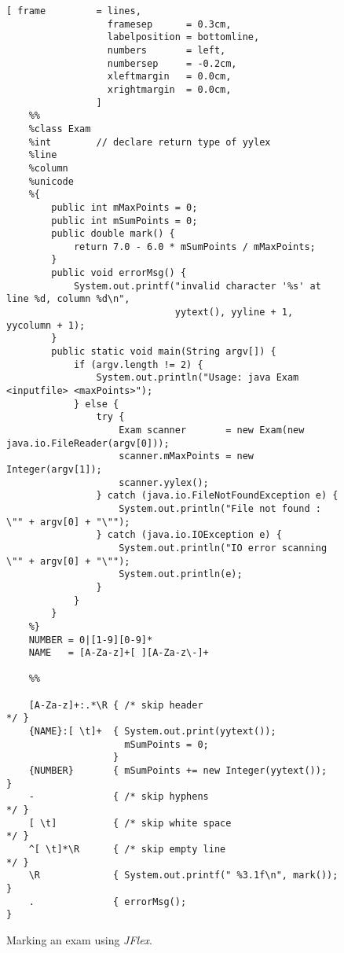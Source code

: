 \begin{figure}[!ht]
\centering
\begin{Verbatim}[ frame         = lines, 
                  framesep      = 0.3cm, 
                  labelposition = bottomline,
                  numbers       = left,
                  numbersep     = -0.2cm,
                  xleftmargin   = 0.0cm,
                  xrightmargin  = 0.0cm,
                ]
    %%
    %class Exam
    %int        // declare return type of yylex
    %line
    %column
    %unicode
    %{
        public int mMaxPoints = 0;
        public int mSumPoints = 0;
        public double mark() {
            return 7.0 - 6.0 * mSumPoints / mMaxPoints;
        } 
        public void errorMsg() {
            System.out.printf("invalid character '%s' at line %d, column %d\n", 
                              yytext(), yyline + 1, yycolumn + 1); 
        }    
        public static void main(String argv[]) {
            if (argv.length != 2) {
                System.out.println("Usage: java Exam <inputfile> <maxPoints>");
            } else {
                try {
                    Exam scanner       = new Exam(new java.io.FileReader(argv[0]));
                    scanner.mMaxPoints = new Integer(argv[1]);
                    scanner.yylex();
                } catch (java.io.FileNotFoundException e) {
                    System.out.println("File not found : \"" + argv[0] + "\"");
                } catch (java.io.IOException e) {
                    System.out.println("IO error scanning \"" + argv[0] + "\"");
                    System.out.println(e);
                } 
            }
        }
    %}
    NUMBER = 0|[1-9][0-9]*
    NAME   = [A-Za-z]+[ ][A-Za-z\-]+

    %%    

    [A-Za-z]+:.*\R { /* skip header                         */ }
    {NAME}:[ \t]+  { System.out.print(yytext()); 
                     mSumPoints = 0;
                   }
    {NUMBER}       { mSumPoints += new Integer(yytext());      }
    -              { /* skip hyphens                        */ }
    [ \t]          { /* skip white space                    */ }
    ^[ \t]*\R      { /* skip empty line                     */ }
    \R             { System.out.printf(" %3.1f\n", mark());    }
    .              { errorMsg();                               }
\end{Verbatim}
\vspace*{-0.3cm}
\caption{Marking an exam using \textsl{JFlex}.}
\label{fig:exam.jflex}
\end{figure}


